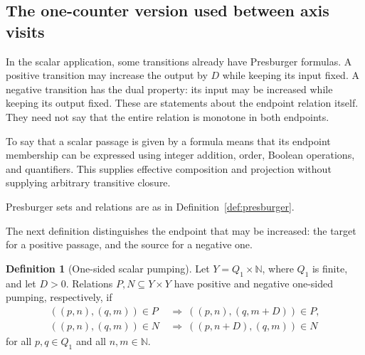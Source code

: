 \documentclass[11pt,a4paper]{article}
\theoremstyle{definition}
\newtheorem{definition}[theorem]{Definition}
\theoremstyle{remark}
\newcommand{\N}{\mathbb N}
\begin{document}
\subsection{The one-counter version used between axis visits}

In the scalar application, some transitions already have Presburger
formulas. A positive transition may increase the output by \(D\)
while keeping its input fixed. A negative transition has the dual
property: its input may be increased while keeping its output fixed.
These are statements about the endpoint relation itself. They need
not say that the entire relation is monotone in both endpoints.

To say that a scalar passage is given by a formula means that its
endpoint membership can be expressed using integer addition, order,
Boolean operations, and quantifiers. This supplies effective
composition and projection without supplying arbitrary transitive
closure.

Presburger sets and relations are as in Definition~\ref{def:presburger}.

The next definition distinguishes the endpoint that may be increased:
the target for a positive passage, and the source for a negative one.

\begin{definition}[One-sided scalar pumping]
\label{def:scalar-one-sided}
Let \(Y=Q_1\times\N\), where \(Q_1\) is finite, and let \(D>0\).
Relations \(P,N\subseteq Y\times Y\) have positive and negative
one-sided pumping, respectively, if
\[
\begin{split}
 ((p,n),(q,m))\in P
   &\ \Longrightarrow\
      ((p,n),(q,m+D))\in P,\\
 ((p,n),(q,m))\in N
   &\ \Longrightarrow\
      ((p,n+D),(q,m))\in N
\end{split}
\]
for all \(p,q\in Q_1\) and all \(n,m\in\N\).
\end{definition}
\end{document}
